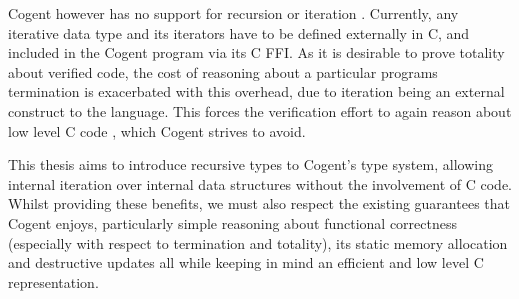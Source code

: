 Cogent however has no support for recursion or iteration . 
Currently, any iterative data type and its iterators have to be defined externally in C,
  and included in the Cogent program via its C FFI.
As it is desirable to prove totality about verified code,
  the cost of reasoning about a particular programs termination is exacerbated with this overhead,
  due to iteration being an external construct to the language.
This forces the verification effort to again reason about low level C code , which Cogent strives to avoid.

This thesis aims to introduce recursive types to Cogent's type system, allowing internal iteration over
  internal data structures without the involvement of C code.
Whilst providing these benefits, we must also respect the existing guarantees that Cogent enjoys,
  particularly simple reasoning about functional correctness (especially with respect to termination and totality),
  its static memory allocation and destructive updates all while keeping in mind
  an efficient and low level C representation.